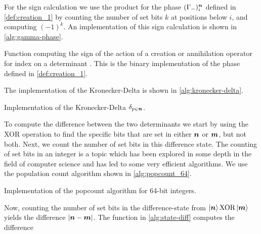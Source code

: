             For the sign calculation we use the product for the phase
            $(\Gamma_{-})^{\boldsymbol{n}}_i$ defined in \autoref{def:creation_1} by
            counting the number of set bits $k$ at positions below $i$, and
            computing $(-1)^k$.
            An implementation of this sign calculation is shown in
            \autoref{alg:gamma-phase}.
            \begin{algorithm}
                \caption{Function computing the sign of the action of a creation
                or annihilation operator for index  on a determinant
                .
                This is the binary implementation of the phase defined in
                \autoref{def:creation_1}.}
                \label{alg:gamma-phase}
            \end{algorithm}
            The implementation of the Kronecker-Delta is shown in
            \autoref{alg:kronecker-delta}.
            \begin{algorithm}
                \caption{Implementation of the Kronecker-Delta $\delta_{p \in
                \boldsymbol{n}}$.}
                \label{alg:kronecker-delta}
            \end{algorithm}
            To compute the difference between the two determinants we start by
            using the XOR operation to find the specific bits that are set in
            either $\boldsymbol{n}$ or $\boldsymbol{m}$, but not both.
            Next, we count the number of set bits in this difference state.
            The counting of set bits in an integer is a topic which has been
            explored in some depth in the field of computer science and has led
            to some very efficient algorithms.
            We use the population count algorithm \cite{popcount} shown in
            \autoref{alg:popcount_64}.
            \begin{algorithm}
                \caption{Implementation of the popcount algorithm for 64-bit
                integers.}
                \label{alg:popcount_64}
            \end{algorithm}
            Now, counting the number of set bits in the difference-state from
            $\ket{\boldsymbol{n}} \text{XOR} \ket{\boldsymbol{m}}$ yields the difference
            $\abs{\boldsymbol{n} - \boldsymbol{m}}$.
            The function in \autoref{alg:state-diff} computes the difference
